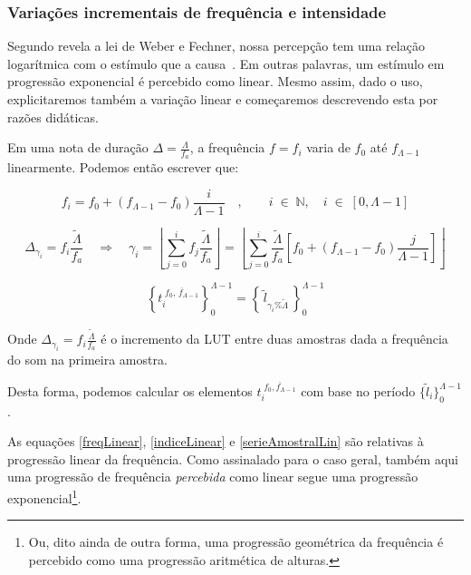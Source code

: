 \subsubsection{Variações incrementais de frequência e intensidade}

Segundo revela a lei de Weber e Fechner, nossa percepção tem uma relação logarítmica com
o estímulo que a causa~\cite{Weber-Fechner}. Em outras palavras, um estímulo em progressão exponencial
é percebido como linear. Mesmo assim, dado o uso, explicitaremos também a variação
linear e começaremos descrevendo esta por razões didáticas.

Em uma nota de duração $\Delta = \frac{\Lambda}{f_a}$, a frequência $f=f_i$ varia de $f_0$ até $f_{\Lambda -1}$
linearmente. Podemos então escrever que:

\begin{equation}\label{freqLinear}
f_i=f_0 + (f_{\Lambda-1}-f_0)\frac{i}{\Lambda-1} \quad ,\quad \quad i \;\in\; \mathbb{N}, \quad i \;\in\; [0,\Lambda-1]
\end{equation}

\begin{equation}\label{indiceLinear}
\Delta_{\gamma_i}=f_i\frac{\widetilde{\Lambda}}{f_a} \quad \Rightarrow \quad \gamma_i=\left \lfloor \sum_{j=0}^{i} f_j\frac{\widetilde{\Lambda}}{f_a} \right \rfloor   =\left \lfloor \sum_{j=0}^{i} \frac{\widetilde{\Lambda}}{f_a} \left [f_0 + (f_{\Lambda-1}-f_0)\frac{j}{\Lambda-1} \right ] \right \rfloor 
\end{equation}

\begin{equation}\label{serieAmostralLin}
\left\{t_i^{\;\overline{f_0,\, f_{\Lambda-1}}}\right\}_0^{\Lambda-1}=\left\{\,\widetilde{l}_{\gamma_i \% \widetilde{\Lambda}}\,\right\}_0^{\Lambda-1}
\end{equation}

Onde $\Delta_{\gamma_i}=f_i\frac{\widetilde{\Lambda}}{f_a}$ é o incremento da LUT entre duas amostras dada a frequência do som na primeira amostra.

Desta forma, podemos calcular os elementos $t_i^{\;\overline{f_0,f_{\Lambda-1}}}$
com base no período $\{\widetilde{l}_i\}_0^{\Lambda-1}$.

As equações \ref{freqLinear}, \ref{indiceLinear} e \ref{serieAmostralLin} são relativas à progressão linear
da frequência. Como assinalado para o caso geral, também aqui
uma progressão de frequência
\emph{percebida} como linear segue uma progressão exponencial\footnote{Ou,
dito ainda de outra forma, uma progressão geométrica da frequência
é percebido como uma progressão aritmética de alturas.}.

